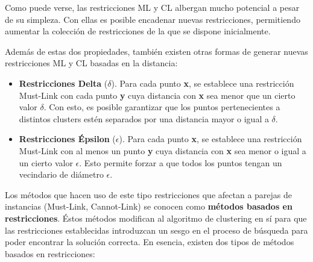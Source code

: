 Como puede verse, las restricciones ML y CL albergan mucho potencial a pesar de su simpleza. Con ellas es posible encadenar nuevas restricciones, permitiendo aumentar la colección de restricciones de la que se dispone inicialmente.

Además de estas dos propiedades, también existen otras formas de generar nuevas restricciones ML y CL basadas en la distancia:

\begin{itemize}
	\item \textbf{Restricciones Delta} ($\delta$). Para cada punto \textbf{x}, se establece una restricción Must-Link con cada punto \textbf{y} cuya distancia con \textbf{x} sea menor que un cierto valor $\delta$. Con esto, es posible garantizar que los puntos pertenecientes a distintos clusters estén separados por una distancia mayor o igual a $\delta$.
	\item \textbf{Restricciones Épsilon} ($\epsilon$). Para cada punto \textbf{x}, se establece una restricción Must-Link con al menos un punto \textbf{y} cuya distancia con \textbf{x} sea menor o igual a un cierto valor $\epsilon$. Esto permite forzar a que todos los puntos tengan un vecindario de diámetro $\epsilon$.
\end{itemize}

Los métodos que hacen uso de este tipo restricciones que afectan a parejas de instancias (Must-Link, Cannot-Link) se conocen como \textbf{métodos basados en restricciones}. Éstos métodos modifican al algoritmo de clustering en sí para que las restricciones establecidas introduzcan un sesgo en el proceso de búsqueda para poder encontrar la solución correcta. En esencia, existen dos tipos de métodos basados en restricciones:

